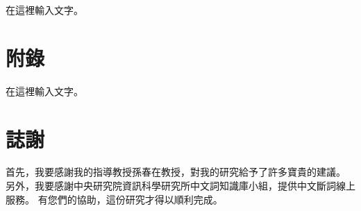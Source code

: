 \documentclass[letterpaper, 10pt, conference]{ieeeconf}   %
\begin{document}
\begin{CJK*}{UTF8}{bsmi}
在這裡輸入文字。

\addtolength{\textheight}{-12cm}  %


\section*{附錄}

在這裡輸入文字。

\section*{誌謝}

首先，我要感謝我的指導教授孫春在教授，對我的研究給予了許多寶貴的建議。
另外，我要感謝中央研究院資訊科學研究所中文詞知識庫小組，提供中文斷詞線上服務。
有您們的協助，這份研究才得以順利完成。





\end{CJK*}
\end{document}

